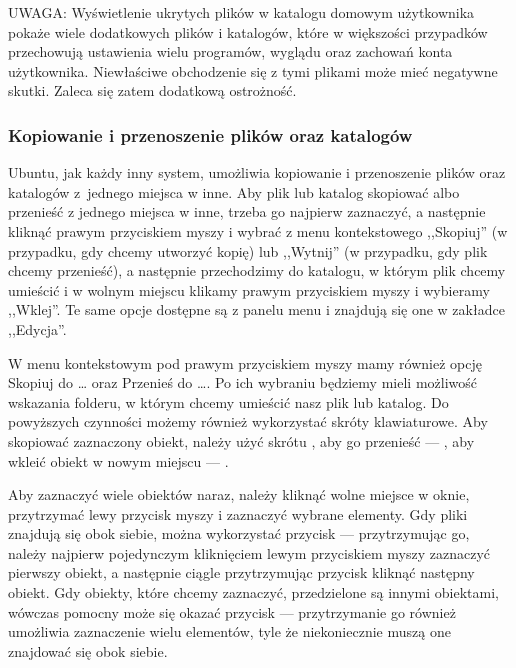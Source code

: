 UWAGA: Wyświetlenie ukrytych plików w katalogu domowym użytkownika pokaże wiele dodatkowych plików i katalogów, które w większości przypadków przechowują ustawienia wielu programów, wyglądu oraz zachowań konta użytkownika. Niewłaściwe obchodzenie się z tymi plikami może mieć negatywne skutki. Zaleca się zatem dodatkową ostrożność.

\subsubsection{Kopiowanie i przenoszenie plików oraz katalogów}
Ubuntu, jak każdy inny system, umożliwia kopiowanie i przenoszenie plików oraz katalogów z~jednego miejsca w inne. Aby plik lub katalog skopiować albo przenieść z jednego miejsca w inne, trzeba go najpierw zaznaczyć, a następnie kliknąć prawym przyciskiem myszy i wybrać z menu kontekstowego ,,Skopiuj'' (w przypadku, gdy chcemy utworzyć kopię) lub ,,Wytnij'' (w przypadku, gdy plik chcemy przenieść), a następnie przechodzimy do katalogu, w którym plik chcemy umieścić i w wolnym miejscu klikamy prawym przyciskiem myszy i wybieramy ,,Wklej''. Te same opcje dostępne są z panelu menu i znajdują się one w zakładce ,,Edycja''.

W menu kontekstowym pod prawym przyciskiem myszy mamy również opcję \textcolor{ubuntu_orange}{Skopiuj do \ldots} oraz \textcolor{ubuntu_orange}{Przenieś do \ldots}. Po ich wybraniu będziemy mieli możliwość wskazania folderu, w którym chcemy umieścić nasz plik lub katalog.
Do powyższych czynności możemy również wykorzystać skróty klawiaturowe. Aby skopiować zaznaczony obiekt, należy użyć skrótu , aby go przenieść --- , aby wkleić obiekt w nowym miejscu --- .

Aby zaznaczyć wiele obiektów naraz, należy kliknąć wolne miejsce w oknie, przytrzymać lewy przycisk myszy i zaznaczyć wybrane elementy. Gdy pliki znajdują się obok siebie, można wykorzystać przycisk  --- przytrzymując go, należy najpierw pojedynczym kliknięciem lewym przyciskiem myszy zaznaczyć pierwszy obiekt, a następnie ciągle przytrzymując przycisk  kliknąć następny obiekt. Gdy obiekty, które chcemy zaznaczyć, przedzielone są innymi obiektami, wówczas pomocny może się okazać przycisk  --- przytrzymanie go również umożliwia zaznaczenie wielu elementów, tyle że niekoniecznie muszą one znajdować się obok siebie.

